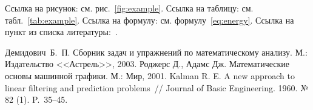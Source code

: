 \documentclass[12pt]{article}
\begin{document}
	Ссылка на рисунок: см. рис.~\ref{fig:example}. Ссылка на таблицу: см. табл.~\ref{tab:example}. Ссылка на формулу: см. формулу~\eqref{eq:energy}. Ссылка на пункт из списка литературы:~\cite{bib:demi}.
	
    \begin{thebibliography}{1}
        Демидович~Б.~П. Сборник задач и упражнений по математическому анализу. М.: Издательство <<Астрель>>, 2003.
        Роджерс Д., Адамс Дж. Математические основы машинной графики. М.: Мир, 2001.
        Kalman R. E. A new approach to linear filtering and prediction problems~// Journal of Basic Engineering. 1960. № 82 (1). P.~35--45.
    \end{thebibliography}
\end{document}
